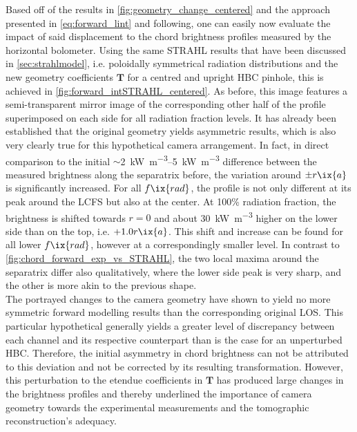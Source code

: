%
            Based off of the results in \cref{fig:geometry_change_centered} and the approach presented in \cref{eq:forward_lint} and following, one can easily now evaluate the impact of said displacement to the chord brightness profiles measured by the horizontal bolometer. Using the same STRAHL results that have been discussed in \cref{sec:strahlmodel}, i.e. poloidally symmetrical radiation distributions and the new geometry coefficients $\mathbf{T}$ for a centred and upright HBC pinhole, this is achieved in \cref{fig:forward_intSTRAHL_centered}. As before, this image features a semi-transparent mirror image of the corresponding other half of the profile superimposed on each side for all radiation fraction levels. It has already been established that the original geometry yields asymmetric results, which is also very clearly true for this hypothetical camera arrangement. In fact, in direct comparison to the initial $\sim$\SIrange{2}{5}{\kilo\watt\per\cubic\meter} difference between the measured brightness along the separatrix before, the variation around $\pm r\ix{a}$ is significantly increased. For all $f\ix{rad}$, the profile is not only different at its peak around the LCFS but also at the center. At 100\% radiation fraction, the brightness is shifted towards $r=0$ and about \SI{30}{\kilo\watt\per\cubic\meter} higher on the lower side than on the top, i.e. $+1.0r\ix{a}$. This shift and increase can be found for all lower $f\ix{rad}$, however at a correspondingly smaller level. In contrast to \cref{fig:chord_forward_exp_vs_STRAHL}, the two local maxima around the separatrix differ also qualitatively, where the lower side peak is very sharp, and the other is more akin to the previous shape.\\%
            The portrayed changes to the camera geometry have shown to yield no more symmetric forward modelling results than the corresponding original LOS. This particular hypothetical generally yields a greater level of discrepancy between each channel and its respective counterpart than is the case for an unperturbed HBC. Therefore, the initial asymmetry in chord brightness can not be attributed to this deviation and not be corrected by its resulting transformation. However, this perturbation to the etendue coefficients in $\mathbf{T}$ has produced large changes in the brightness profiles and thereby underlined the importance of camera geometry towards the experimental measurements and the tomographic reconstruction's adequacy.%
%
